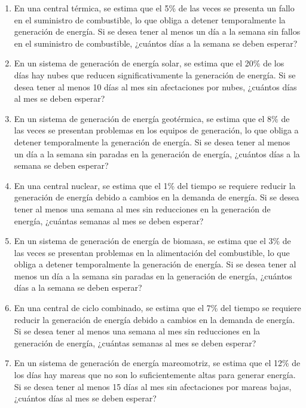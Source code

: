 \begin{Ejer}
\begin{enumerate}
    \item En una central térmica, se estima que el 5\% de las veces se presenta un fallo en el suministro de combustible, lo que obliga a detener temporalmente la generación de energía. Si se desea tener al menos un día a la semana sin fallos en el suministro de combustible, ¿cuántos días a la semana se deben esperar?

    \item En un sistema de generación de energía solar, se estima que el 20\% de los días hay nubes que reducen significativamente la generación de energía. Si se desea tener al menos 10 días al mes sin afectaciones por nubes, ¿cuántos días al mes se deben esperar?

    \item En un sistema de generación de energía geotérmica, se estima que el 8\% de las veces se presentan problemas en los equipos de generación, lo que obliga a detener temporalmente la generación de energía. Si se desea tener al menos un día a la semana sin paradas en la generación de energía, ¿cuántos días a la semana se deben esperar?

    \item En una central nuclear, se estima que el 1\% del tiempo se requiere reducir la generación de energía debido a cambios en la demanda de energía. Si se desea tener al menos una semana al mes sin reducciones en la generación de energía, ¿cuántas semanas al mes se deben esperar?

    \item En un sistema de generación de energía de biomasa, se estima que el 3\% de las veces se presentan problemas en la alimentación del combustible, lo que obliga a detener temporalmente la generación de energía. Si se desea tener al menos un día a la semana sin paradas en la generación de energía, ¿cuántos días a la semana se deben esperar?

    \item En una central de ciclo combinado, se estima que el 7\% del tiempo se requiere reducir la generación de energía debido a cambios en la demanda de energía. Si se desea tener al menos una semana al mes sin reducciones en la generación de energía, ¿cuántas semanas al mes se deben esperar?

    \item En un sistema de generación de energía mareomotriz, se estima que el 12\% de los días hay mareas que no son lo suficientemente altas para generar energía. Si se desea tener al menos 15 días al mes sin afectaciones por mareas bajas, ¿cuántos días al mes se deben esperar?


\end{enumerate}
\end{Ejer} 


